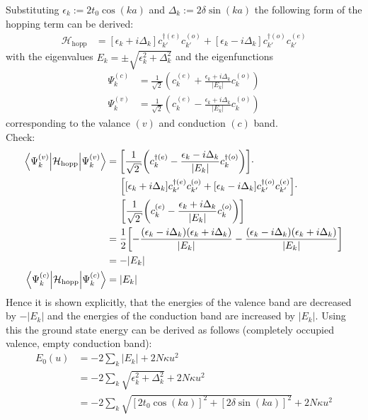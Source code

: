 Substituting $\epsilon_k := 2t_0\cos(ka)$ and $\Delta_k := 2\delta\sin(ka)$ the following form of the hopping term can be derived:
\begin{align}
	\mathcal{H}_{\text{hopp}} &=
	\left[\epsilon_k + i\Delta_k\right]c_{k'}^{\dagger(e)}c_{k'}^{(o)} + \left[\epsilon_k-i\Delta_k \right]	c_{k'}^{\dagger(o)}c_{k'}^{(e)}
\end{align}
with the eigenvalues $E_k = \pm \sqrt{\epsilon_k^2+\Delta_k^2}$ and the eigenfunctions
\begin{align}
	\Psi_k^{(c)} &= \frac{1}{\sqrt{2}}\left(c_k^{(e)}+\frac{\epsilon_k + i \Delta_k}{|E_k|}c_{k}^{(o)}\right)\\
	\Psi_k^{(v)} &= \frac{1}{\sqrt{2}}\left(c_k^{(e)}-\frac{\epsilon_k + i \Delta_k}{|E_k|}c_{k}^{(o)}\right)
\end{align}
corresponding to the valance $(v)$ and conduction $(c)$ band.\\
Check:
\begin{align}
	\left\langle\Psi_k^{(v)}\Big|\mathcal{H}_{\text{hopp}}\Big|\Psi_k^{(v)}\right\rangle &=  \left[\frac{1}{\sqrt{2}}\left(c_k^{\dagger(e)}-\frac{\epsilon_k - i \Delta_k}{|E_k|}c_{k}^{\dagger(o)}\right)\right]\cdot\nonumber \\
	&\hspace*{.5cm}\left[
	\left[\epsilon_k + i\Delta_k\right]c_{k'}^{\dagger(e)}c_{k'}^{(o)} + \left[\epsilon_k-i\Delta_k \right]	c_{k'}^{\dagger(o)}c_{k'}^{(e)}
	\right]\cdot\nonumber\\
	&\hspace*{.5cm}\left[\frac{1}{\sqrt{2}}\left(c_k^{(e)}-\frac{\epsilon_k + i \Delta_k}{|E_k|}c_{k}^{(o)}\right)\right]\\
	&=  \frac{1}{2}\left[-\frac{(\epsilon_k-i\Delta_k)(\epsilon_k+i\Delta_k)}{|E_k|}-\frac{(\epsilon_k-i\Delta_k)(\epsilon_k+i\Delta_k)}{|E_k|}\right]\\
	&= - |E_k|\\
	\left\langle\Psi_k^{(c)}\Big|\mathcal{H}_{\text{hopp}}\Big|\Psi_k^{(c)}\right\rangle &= |E_k|
\end{align}
Hence it is shown explicitly, that the energies of the valence band are decreased by $-|E_k|$ and the energies of the conduction band are increased by $|E_k|$. Using this the ground state energy can be derived as follows (completely occupied valence, empty conduction band):
\begin{align}
	E_0(u) &=-2\sum_k |E_k| + 2N\kappa u^2\\
	&= -2\sum_k \sqrt{\epsilon_k^2+\Delta_k^2} + 2N\kappa u^2\\
	&= -2\sum_k \sqrt{\left[2t_0\cos(ka)\right]^2+\left[2\delta\sin(ka)\right]^2} + 2N\kappa u^2\\
\end{align}

